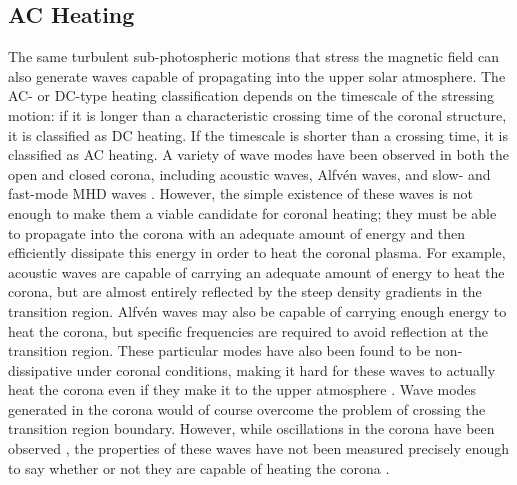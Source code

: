 \subsection{AC Heating}
\label{subsec:ac_heating}
\par The same turbulent sub-photospheric motions that stress the magnetic field can also generate waves capable of propagating into the upper solar atmosphere. The AC- or DC-type heating classification depends on the timescale of the stressing motion: if it is longer than a characteristic crossing time of the coronal structure, it is classified as DC heating. If the timescale is shorter than a crossing time, it is classified as AC heating. A variety of wave modes have been observed in both the open and closed corona, including acoustic waves, Alfv\'{e}n waves, and slow- and fast-mode MHD waves \citep{aschwanden_physics_2006}. However, the simple existence of these waves is not enough to make them a viable candidate for coronal heating; they must be able to propagate into the corona with an adequate amount of energy and then efficiently dissipate this energy in order to heat the coronal plasma. For example, acoustic waves are capable of carrying an adequate amount of energy to heat the corona, but are almost entirely reflected by the steep density gradients in the transition region. Alfv\'{e}n waves may also be capable of carrying enough energy to heat the corona, but specific frequencies are required to avoid reflection at the transition region. These particular modes have also been found to be non-dissipative under coronal conditions, making it hard for these waves to actually heat the corona even if they make it to the upper atmosphere \citep{klimchuk_solving_2006}. Wave modes generated in the corona would of course overcome the problem of crossing the transition region boundary. However, while oscillations in the corona have been observed \citep{de_moortel_longitudinal_2002,de_moortel_longitudinal_2002-1}, the properties of these waves have not been measured precisely enough to say whether or not they are capable of heating the corona \citep{klimchuk_solving_2006}.
%
